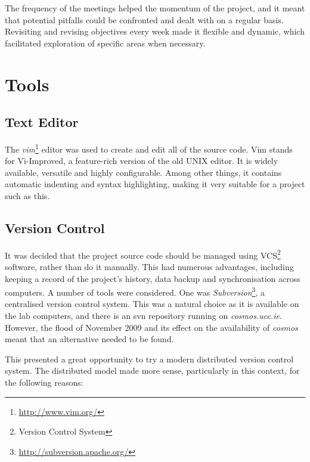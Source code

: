 The frequency of the meetings helped the momentum of the project, and it meant
that potential pitfalls could be confronted and dealt with on a regular basis.
Revisiting and revising objectives every week made it flexible and dynamic,
which facilitated exploration of specific areas when necessary.


\section{Tools}

\subsection{Text Editor}

The \emph{vim}\footnote{\url{http://www.vim.org/}} editor was used to create and
edit all of the source code. Vim stands for Vi-Improved, a feature-rich version
of the old UNIX editor. It is widely available, versatile and highly
configurable. Among other things, it contains automatic indenting and syntax
highlighting, making it very suitable for a project such as this.

\subsection{Version Control}

It was decided that the project source code should be managed using
VCS\footnote{Version Control System} software, rather than do it manually. This
had numerous advantages, including keeping a record of the project's history,
data backup and synchronisation across computers. A number of tools were
considered. One was
\emph{Subversion}\footnote{\url{http://subversion.apache.org/}}, a centralised
version control system. This was a natural choice as it is available on the lab
computers, and there is an svn repository running on \emph{cosmos.ucc.ie}.
However, the flood of November 2009 and its effect on the availability of
\emph{cosmos} meant that an alternative needed to be found.

This presented a great opportunity to try a modern distributed version control
system. The distributed model made more sense, particularly in this context, for
the following reasons:

